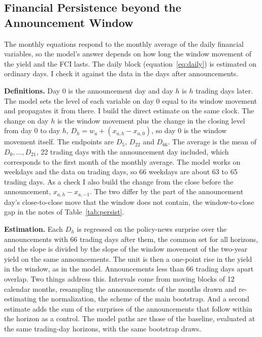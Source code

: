 \documentclass[11pt]{article}
\begin{document}
\begin{appendices}


\FloatBarrier
\section{Financial Persistence beyond the Announcement Window}\label{app:persist}
The monthly equations respond to the monthly average of the daily financial variables, so the model's answer depends on how long the window movement of the yield and the FCI lasts. The daily block (equation~\eqref{eq:daily}) is estimated on ordinary days. I check it against the data in the days after announcements.

\textbf{Definitions.} Day 0 is the announcement day and day $h$ is $h$ trading days later. The model sets the level of each variable on day 0 equal to its window movement and propagates it from there. I build the direct estimate on the same clock. The change on day $h$ is the window movement plus the change in the closing level from day 0 to day $h$, $D_h=w_a+(x_{a,h}-x_{a,0})$, so day 0 is the window movement itself. The endpoints are $D_5$, $D_{22}$ and $D_{66}$. The average is the mean of $D_0,\dots,D_{21}$, 22 trading days with the announcement day included, which corresponds to the first month of the monthly average. The model works on weekdays and the data on trading days, so 66 weekdays are about 63 to 65 trading days. As a check I also build the change from the close before the announcement, $x_{a,h}-x_{a,-1}$. The two differ by the part of the announcement day's close-to-close move that the window does not contain, the window-to-close gap in the notes of Table~\ref{tab:persist}.

\textbf{Estimation.} Each $D_h$ is regressed on the policy-news surprise over the  announcements with 66 trading days after them, the common set for all horizons, and the slope is divided by the slope of the window movement of the two-year yield on the same announcements. The unit is then a one-point rise in the yield in the window, as in the model. Announcements less than 66 trading days apart overlap. Two things address this. Intervals come from moving blocks of 12 calendar months, resampling the announcements of the months drawn and re-estimating the normalization, the scheme of the main bootstrap. And a second estimate adds the sum of the surprises of the announcements that follow within the horizon as a control. The model paths are those of the baseline, evaluated at the same trading-day horizons, with the same bootstrap draws.


\end{appendices}
\end{document}
